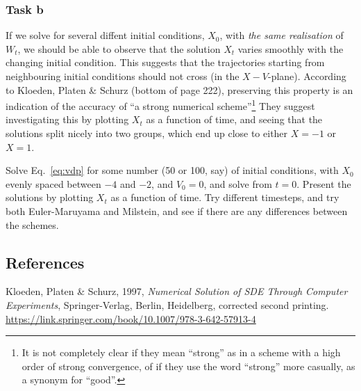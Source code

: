 \documentclass[a4paper]{article}
\begin{document}
\subsubsection*{Task b}

If we solve for several diffent initial conditions, $X_0$, with \emph{the same realisation} of $W_t$, we should be able to observe that the solution $X_t$ varies smoothly with the changing initial condition. This suggests that the trajectories starting from neighbouring initial conditions should not cross (in the $X-V$-plane). According to Kloeden, Platen \& Schurz (bottom of page 222), preserving this property is an indication of the accuracy of ``a strong numerical scheme''\footnote{It is not completely clear if they mean ``strong'' as in a scheme with a high order of strong convergence, of if they use the word ``strong'' more casually, as a synonym for ``good''.} They suggest investigating this by plotting $X_t$ as a function of time, and seeing that the solutions split nicely into two groups, which end up close to either $X=-1$ or $X=1$.

Solve Eq.~\eqref{eq:vdp} for some number (50 or 100, say) of initial conditions, with $X_0$ evenly spaced between $-4$ and $-2$, and $V_0=0$, and solve from $t=0$. Present the solutions by plotting $X_t$ as a function of time. Try different timesteps, and try both Euler-Maruyama and Milstein, and see if there are any differences between the schemes.


\subsection*{References}

Kloeden, Platen \& Schurz, 1997, \emph{Numerical Solution of SDE Through Computer Experiments}, Springer-Verlag, Berlin, Heidelberg, corrected second printing.
\url{https://link.springer.com/book/10.1007/978-3-642-57913-4}
\end{document}
